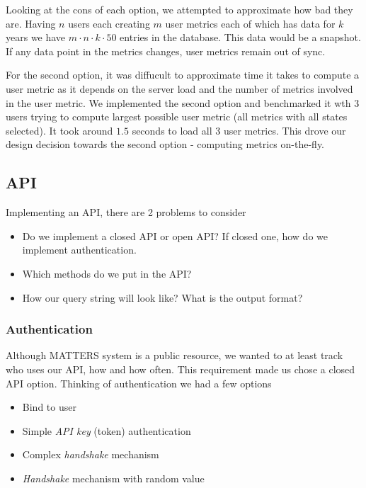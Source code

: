 		Looking at the cons of each option, we attempted to approximate how bad they are. Having $n$ users each creating $m$ user metrics each of which has data for $k$ years we have $m \cdot n \cdot k \cdot 50$ entries in the database. This data would be a snapshot. If any data point in the metrics changes, user metrics remain out of sync.

		For the second option, it was diffucult to approximate time it takes to compute a user metric as it depends on the server load and the number of metrics involved in the user metric. We implemented the second option and benchmarked it wth $3$ users trying to compute largest possible user metric (all metrics with all states selected). It took around $1.5$ seconds to load all $3$ user metrics. This drove our design decision towards the second option - computing metrics on-the-fly.

	\subsection{API}
		
		Implementing an API, there are 2 problems to consider
		\begin{itemize}
			\item
				Do we implement a closed API or open API? If closed one, how do we implement authentication.
			\item
				Which methods do we put in the API?
			\item
				How our query string will look like? What is the output format?
		\end{itemize}
		
		\subsubsection{Authentication}
			
			Although MATTERS system is a public resource, we wanted to at least track who uses our API, how and how often. This requirement made us chose a closed API option. Thinking of authentication we had a few options
			\begin{itemize}
				\item
					Bind to user
				\item
					Simple \emph{API key} (token) authentication
				\item
					Complex \emph{handshake} mechanism					
				\item
					\emph{Handshake} mechanism with random value
			\end{itemize}
			
